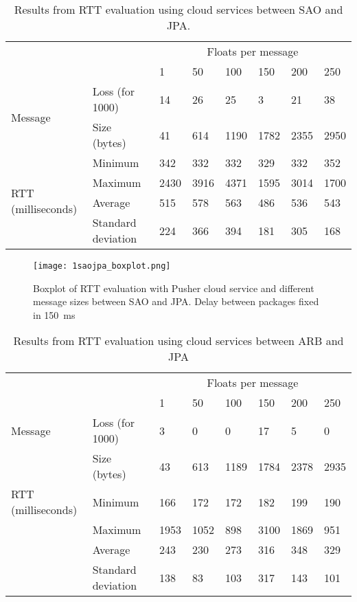 \begin{table}[!ht]
	\centering
	\begin{tabular}{ll|llllll|}
		&                    & \multicolumn{6}{c|}{Floats per message} \\
		&                    & 1    & 50   & 100  & 150  & 200  & 250  \\ \hline
		\multirow{2}{*}{Message}            & Loss (for 1000)      & 14   & 26   & 25   & 3    & 21   & 38   \\
		& Size (bytes)       & 41   & 614  & 1190 & 1782 & 2355 & 2950 \\ \cline{1-2}
		\multirow{4}{*}{RTT (milliseconds)} & Minimum            & 342  & 332  & 332  & 329  & 332  & 352  \\
		& Maximum            & 2430 & 3916 & 4371 & 1595 & 3014 & 1700 \\
		& Average            & 515  & 578  & 563  & 486  & 536  & 543  \\
		& Standard deviation & 224  & 366  & 394  & 181  & 305  & 168  \\ \hline
	\end{tabular}
	
	\caption{Results from RTT evaluation using cloud services between SAO and JPA.}
	\label{tab:sao-jpa}
\end{table}

\begin{figure}[!ht]
	\centering
	\texttt{[image: 1saojpa\_boxplot.png]}
	\caption{Boxplot of RTT evaluation with Pusher cloud service and different message sizes between SAO and JPA. Delay between packages fixed in 150~ms}
	\label{fig:sao-jpa-boxplot}
\end{figure}

\begin{table}[!ht]
	\centering
	\begin{tabular}{ll|llllll|}
		&                    & \multicolumn{6}{c|}{Floats per message}  \\
		&                    & 1    & 50   & 100  & 150  & 200  & 250  \\ \hline
		Message             & Loss (for 1000)      & 3    & 0    & 0    & 17   & 5    & 0    \\
		& Size (bytes)       & 43   & 613  & 1189 & 1784 & 2378 & 2935 \\ \cline{1-2}
		RTT (milliseconds) & Minimum            & 166  & 172  & 172  & 182  & 199  & 190  \\
		& Maximum            & 1953 & 1052 & 898  & 3100 & 1869 & 951  \\
		& Average            & 243  & 230  & 273  & 316  & 348  & 329  \\
		& Standard deviation & 138  & 83   & 103  & 317  & 143  & 101  \\ \hline
	\end{tabular}
	
	\caption{Results from RTT evaluation using cloud services between ARB and JPA}
	\label{tab:arb-jpa}
\end{table}

